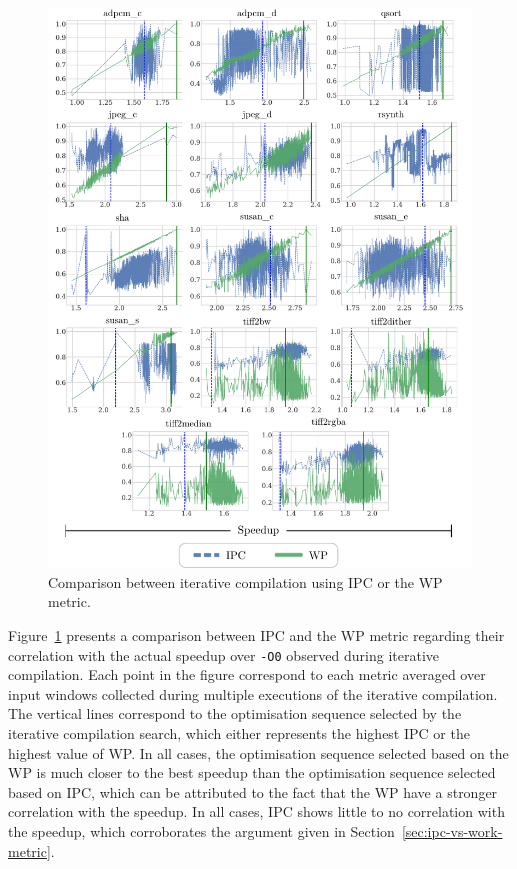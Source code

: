 \documentclass[sigplan,10pt]{acmart}
\newcommand{\itercomp}{{iterative compilation}}
\begin{document}
\begin{figure}[h]
    \centering
    \includegraphics[width=\textwidth]{figs/ipc-vs-work.pdf}
    \caption{Comparison between {\itercomp} using IPC or the WP metric.}
    \label{fig:ipc-vs-work}
\end{figure}


Figure~\ref{fig:ipc-vs-work} presents a comparison between IPC and the WP metric regarding their correlation with the actual speedup over \verb|-O0| observed during {\itercomp}.
Each point in the figure correspond to each metric averaged over input windows collected during multiple executions of the {\itercomp}.
The vertical lines correspond to the optimisation sequence selected by the {\itercomp} search, which either represents the highest IPC or the highest value of WP.
In all cases, the optimisation sequence selected based on the WP is much closer to the best speedup than the optimisation sequence selected based on IPC, which can be attributed to the fact that the WP have a stronger correlation with the speedup.
In all cases, IPC shows little to no correlation with the speedup, which corroborates the argument given in Section~\ref{sec:ipc-vs-work-metric}.
\end{document}

